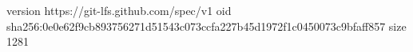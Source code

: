 version https://git-lfs.github.com/spec/v1
oid sha256:0e0e62f9cb893756271d51543c073ccfa227b45d1972f1c0450073c9bfaff857
size 1281
